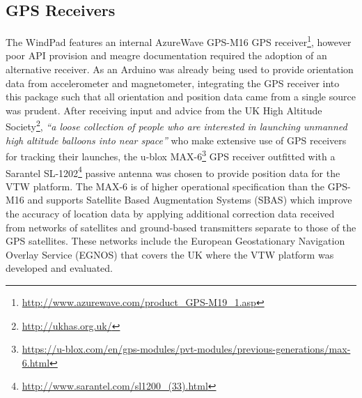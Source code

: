 
\subsection{GPS Receivers}

\newcommand{\azurewaveFootnote}{\footnote{\url{http://www.azurewave.com/product_GPS-M19_1.asp}}}

\newcommand{\habFootnote}{\footnote{\url{http://ukhas.org.uk/}}}

\newcommand{\ubloxFootnote}{\footnote{\url{https://u-blox.com/en/gps-modules/pvt-modules/previous-generations/max-6.html}}}

\newcommand{\sarantelFootnote}{\footnote{\url{http://www.sarantel.com/sl1200_(33).html}}}

\newcommand{\MAXvccFootnote}{\footnote{The MAX-6 requires 2.5 to 3.6V input on VCC, this table showing connection to 5V assumes a MAX-6 breakout with appropriate step down.}}

\newcommand{\MAXserialFootnote}{\footnote{The data pins of the MAX-6 need to be pulled up to between 0.7 to 1.0 of the supply to VCC, so a breakout with appropriate level shifters is required for connection directly to an Ardunio Uno R3's 5V digital pins.}}

\newcommand{\softwareserialFootnote}{\footnote{\url{http://arduino.cc/en/Reference/SoftwareSerial}}}

\newcommand{\maxProtocolFootnote}{\footnote{\url{https://u-blox.com/images/downloads/Product_Docs/u-blox6_ReceiverDescriptionProtocolSpec_(GPS.G6-SW-10018).pdf}}}

\newcommand{\tinygpsFootnote}{\footnote{\url{http://arduiniana.org/libraries/tinygps/}}}


The WindPad features an internal AzureWave GPS-M16 GPS receiver\azurewaveFootnote{}, however poor API provision and meagre documentation required the adoption of an alternative receiver. As an Arduino was already being used to provide orientation data from accelerometer and magnetometer, integrating the GPS receiver into this package such that all orientation and position data came from a single source was prudent. After receiving input and advice from the UK High Altitude Society\habFootnote{}, \textit{``a loose collection of people who are interested in launching unmanned high altitude balloons into near space''} who make extensive use of GPS receivers for tracking their launches, the u-blox MAX-6\ubloxFootnote{} GPS receiver outfitted with a Sarantel SL-1202\sarantelFootnote{} passive antenna was chosen to provide position data for the VTW platform. The MAX-6 is of higher operational specification than the GPS-M16 and supports Satellite Based Augmentation Systems (SBAS) which improve the accuracy of location data by applying additional correction data received from networks of satellites and ground-based transmitters separate to those of the GPS satellites. These networks include the European Geostationary Navigation Overlay Service (EGNOS) that covers the UK where the VTW platform was developed and evaluated.

